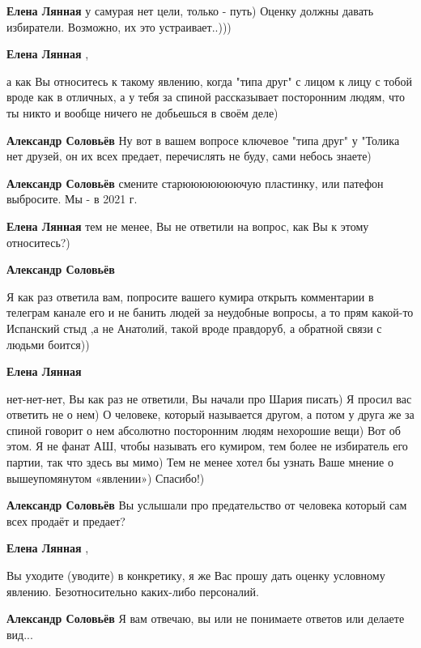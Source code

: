 \begin{itemize}
\begin{itemize} %
\textbf{Елена Лянная} у самурая нет цели, только - путь) Оценку должны давать избиратели. Возможно, их это устраивает..)))

\textbf{Елена Лянная} , 

а как Вы относитесь к такому явлению, когда "типа друг" с лицом к лицу с тобой
вроде как в отличных, а у тебя за спиной рассказывает посторонним людям, что ты
никто и вообще ничего не добьешься в своём деле)


\textbf{Александр Соловьёв} Ну вот в вашем вопросе ключевое "типа друг" у "Толика нет друзей, он их всех предает, перечислять не буду, сами небось знаете)

\textbf{Александр Соловьёв} смените старююююююючую пластинку, или патефон выбросите. Мы - в 2021 г.

\textbf{Елена Лянная} тем не менее, Вы не ответили на вопрос, как Вы к этому относитесь?)

\textbf{Александр Соловьёв} 

Я как раз ответила вам, попросите вашего кумира открыть комментарии в телеграм
канале его и не банить людей за неудобные вопросы, а то прям какой-то Испанский
стыд ,а не Анатолий, такой вроде правдоруб, а обратной связи с людьми боится))

\textbf{Елена Лянная} 

нет-нет-нет, Вы как раз не ответили, Вы начали про Шария писать) Я просил вас
ответить не о нем) О человеке, который называется другом, а потом у друга же за
спиной говорит о нем абсолютно посторонним людям нехорошие вещи) Вот об этом. Я
не фанат АШ, чтобы называть его кумиром, тем более не избиратель его партии,
так что здесь вы мимо) Тем не менее хотел бы узнать Ваше мнение о
вышеупомянутом «явлении») Спасибо!)

\textbf{Александр Соловьёв} Вы услышали про предательство от человека который сам всех продаёт и предает?

\textbf{Елена Лянная} , 

Вы уходите (уводите) в конкретику, я же Вас прошу дать оценку условному
явлению. Безотносительно каких-либо персоналий.

\textbf{Александр Соловьёв} Я вам отвечаю, вы или не понимаете ответов или делаете вид...


\end{itemize}
\end{itemize}
